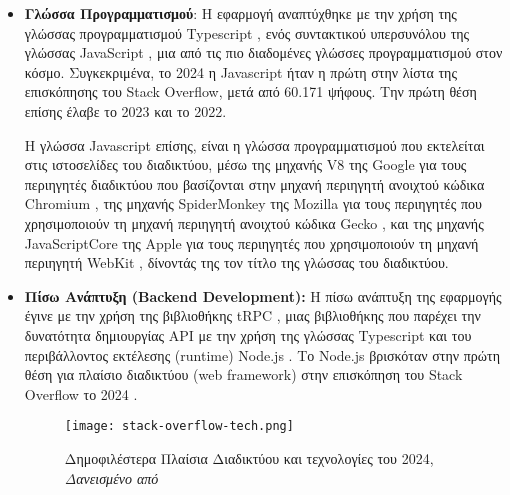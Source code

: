 \begin{itemize}
  \item
    \textbf{Γλώσσα Προγραμματισμού}: Η εφαρμογή αναπτύχθηκε με την χρήση
    της γλώσσας προγραμματισμού \textlatin{Typescript} \cite{typescript},
    ενός συντακτικού υπερσυνόλου της γλώσσας \textlatin{JavaScript}
    \cite{javascript}, μια από τις πιο διαδομένες γλώσσες προγραμματισμού
    στον κόσμο. \cite{tiobe, languagechart} Συγκεκριμένα, το 2024 η
    \textlatin{Javascript} ήταν η πρώτη στην λίστα της επισκόπησης του
    \textlatin{Stack Overflow}, μετά από 60.171 ψήφους. \cite{so2024} Την
    πρώτη θέση επίσης έλαβε το 2023 και το 2022. \cite{so2022,so2023}

    Η γλώσσα \textlatin{Javascript} επίσης, είναι η γλώσσα προγραμματισμού
    που εκτελείται στις ιστοσελίδες του διαδικτύου, μέσω της μηχανής
    \textlatin{V8} της \textlatin{Google} \cite{v8} για τους περιηγητές
    διαδικτύου που βασίζονται στην μηχανή περιηγητή ανοιχτού κώδικα
    \textlatin{Chromium} \cite{chromium}, της μηχανής
    \textlatin{SpiderMonkey} της \textlatin{Mozilla} \cite{spidermonkey}
    για τους περιηγητές που χρησιμοποιούν τη μηχανή περιηγητή ανοιχτού
    κώδικα \textlatin{Gecko} \cite{gecko}, και της μηχανής
    \textlatin{JavaScriptCore} της \textlatin{Apple} \cite{javascriptcore}
    για τους περιηγητές που χρησιμοποιούν τη μηχανή περιηγητή
    \textlatin{WebKit} \cite{webkit}, δίνοντάς της τον τίτλο της γλώσσας
    του διαδικτύου.
  \item
    \textbf{Πίσω Ανάπτυξη (\textlatin{Backend Development}):} Η πίσω
    ανάπτυξη της εφαρμογής έγινε με την χρήση της βιβλιοθήκης
    \textlatin{tRPC} \cite{trpc}, μιας βιβλιοθήκης που παρέχει την
    δυνατότητα δημιουργίας \textlatin{API} με την χρήση της γλώσσας
    \textlatin{Typescript} και του περιβάλλοντος εκτέλεσης
    (\textlatin{runtime}) \textlatin{Node.js} \cite{node}. Το
    \textlatin{Node.js} βρισκόταν στην πρώτη θέση για πλαίσιο διαδικτύου
    (\textlatin{web framework}) στην επισκόπηση του \textlatin{Stack
    Overflow} το 2024 \cite{so2024}.
    \begin{figure}[H]
      \begin{center}
        \texttt{[image: stack-overflow-tech.png]}
        \caption{Δημοφιλέστερα Πλαίσια Διαδικτύου και τεχνολογίες του
        2024, \textit{Δανεισμένο από \cite{so2024}}}
      \end{center}
      \label{fig:SO2024FRAMEWORKS}
    \end{figure}


\end{itemize}
